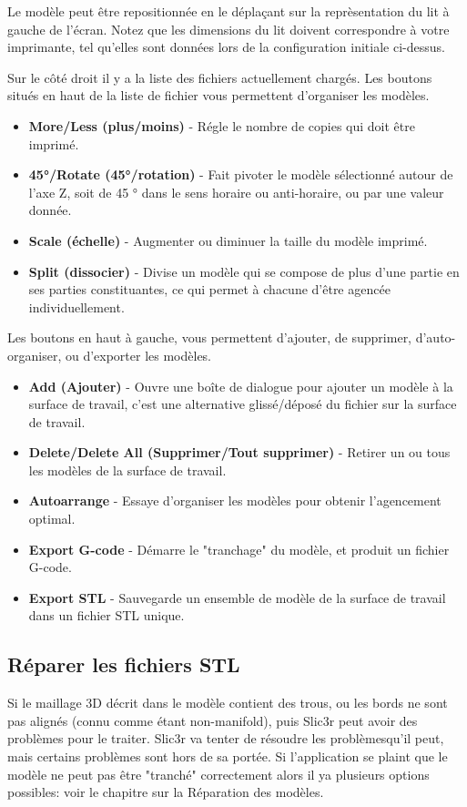 Le modèle peut être repositionnée en le déplaçant sur la reprèsentation du lit à gauche de l'écran. Notez que les dimensions du lit doivent correspondre à votre imprimante, tel qu'elles sont données lors de la configuration initiale ci-dessus.

Sur le côté droit il y a la liste des fichiers actuellement chargés. Les boutons situés en haut de la liste de fichier vous permettent d'organiser les modèles.
\begin{itemize}
	\item \textbf{More/Less (plus/moins)}  - Régle le nombre de copies qui doit être imprimé.
	\item \textbf{45°/Rotate (45°/rotation)}  - Fait pivoter le modèle sélectionné autour de l'axe Z, soit de 45 ° dans le sens horaire ou anti-horaire, ou par une valeur donnée.
	\item \textbf{Scale (échelle)}  - Augmenter ou diminuer la taille du modèle imprimé.
	\item \textbf{Split (dissocier)}  - Divise un modèle qui se compose de plus d'une partie en ses parties constituantes, ce qui permet à chacune d'être agencée individuellement.
\end{itemize}


Les boutons en haut à gauche, vous permettent d'ajouter, de supprimer, d'auto-organiser, ou d'exporter les modèles.
\begin{itemize}
	\item \textbf{Add (Ajouter)}  - Ouvre une boîte de dialogue pour ajouter un modèle à la surface de travail, c'est une alternative glissé/déposé du fichier sur la surface de travail.
	\item \textbf{Delete/Delete All (Supprimer/Tout supprimer)}  - Retirer un ou tous les modèles de la surface de travail.
	\item \textbf{Autoarrange}  - Essaye d'organiser les modèles pour obtenir l'agencement optimal.
	\item \textbf{Export G-code}  - Démarre le "tranchage" du modèle, et produit un fichier G-code.
	\item \textbf{Export STL}  - Sauvegarde un ensemble de modèle de la surface de travail dans un fichier STL unique.
\end{itemize}



\subsection{Réparer les fichiers STL} %
\label{sub:cleaning_stls}
Si le maillage 3D décrit dans le modèle contient des trous, ou les bords ne sont pas alignés (connu comme étant non-manifold), puis Slic3r peut avoir des problèmes pour le traiter. Slic3r va tenter de résoudre les problèmesqu'il peut, mais certains problèmes sont hors de sa portée. Si l'application se plaint que le modèle ne peut pas être "tranché" correctement alors il ya plusieurs options possibles: voir le chapitre sur la Réparation des modèles.

